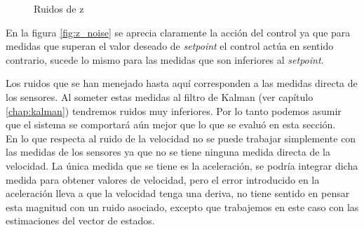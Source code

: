 \documentclass[main]{subfiles}
\begin{document}
\begin{figure}
  \centering
  \caption{Ruidos de z}
  \label{fig:ruidos_z}
\end{figure}

En la figura \ref{fig:z_noise} se aprecia claramente la acci\'on del control ya que para medidas que superan el valor deseado de \emph{setpoint} el control act\'ua en sentido contrario, sucede lo mismo para las medidas que son inferiores al \emph{setpoint}.

Los ruidos que se han menejado hasta aqu\'i corresponden a las medidas directa de los sensores. Al someter estas medidas al filtro de Kalman (ver cap\'itulo \ref{chap:kalman}) tendremos ruidos muy inferiores. Por lo tanto podemos asumir que el sistema se comportar\'a a\'un mejor que lo que se evalu\'o en esta secci\'on.\\

En lo que respecta al ruido de la velocidad no se puede trabajar simplemente con las medidas de los sensores ya que no se tiene ninguna medida directa de la velocidad. La \'unica medida que se tiene es la aceleraci\'on, se podr\'ia integrar dicha medida para obtener valores de velocidad, pero el error introducido en la aceleraci\'on lleva a que la velocidad tenga una deriva, no tiene sentido en pensar esta magnitud con un ruido asociado, excepto que trabajemos en este caso con las estimaciones del vector de estados. 
\end{document}
